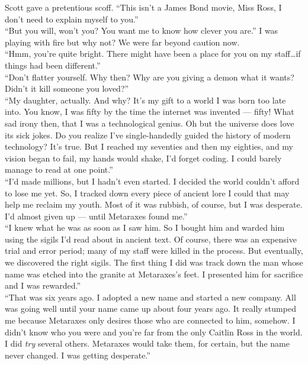 \documentclass[a5paper]{scrartcl}
\begin{document}
Scott gave a pretentious scoff. \enquote{This isn't a James Bond movie, Miss Ross, I don't need to explain myself to you.}\\


\enquote{But you will, won't you? You want me to know how clever you are.} I was playing with fire but why not? We were far beyond caution now. \\


\enquote{Hmm, you're quite bright. There might have been a place for you on my staff\dots if things had been different.}\\


\enquote{Don't flatter yourself. Why then? Why are you giving a demon what it wants? Didn't it kill someone you loved?}\\


\enquote{My daughter, actually. And why? It's my gift to a world I was born too late into. You know, I was fifty by the time the internet was invented --- fifty! What sad irony then, that I was a technological genius. Oh but the universe does love its sick jokes. Do you realize I've single-handedly guided the history of modern technology? It's true. But I reached my seventies and then my eighties, and my vision began to fail, my hands would shake, I'd forget coding. I could barely manage to read at one point.}\\


\enquote{I'd made millions, but I hadn't even started. I decided the world couldn't afford to lose me yet. So, I tracked down every piece of ancient lore I could that may help me reclaim my youth. Most of it was rubbish, of course, but I was desperate. I'd almost given up --- until Metaraxes found me.}\\


\enquote{I knew what he was as soon as I saw him. So I bought him and warded him using the sigils I'd read about in ancient text.  Of course, there was an expensive trial and error period; many of my staff were killed in the process. But eventually, we discovered the right sigils. The first thing I did was track down the man whose name was etched into the granite at Metaraxes's feet. I presented him for sacrifice and I was rewarded.}\\


\enquote{That was six years ago. I adopted a new name and started a new company. All was going well until your name came up about four years ago. It really stumped me because Metaraxes only desires those who are connected to him, somehow. I didn't know who you were and you're far from the only Caitlin Ross in the world. I did \textit{try}
 several others. Metaraxes would take them, for certain, but the name never changed. I was getting desperate.}\\
\end{document}
